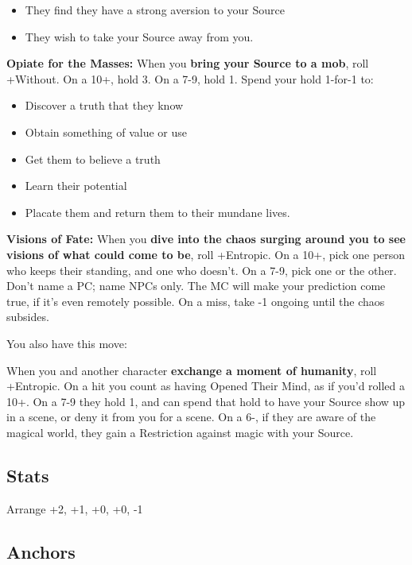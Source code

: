 \documentclass[
  oneside,
  statementpaper,
  9pt]{memoir}
\begin{document}
\begin{itemize}
\tightlist
\item
  They find they have a strong aversion to your Source
\item
  They wish to take your Source away from you.
\end{itemize}

\textbf{Opiate for the Masses:} When you \textbf{bring your Source to a
mob}, roll +Without. On a 10+, hold 3. On a 7-9, hold 1. Spend your hold
1-for-1 to:

\begin{itemize}
\tightlist
\item
  Discover a truth that they know
\item
  Obtain something of value or use
\item
  Get them to believe a truth
\item
  Learn their potential
\item
  Placate them and return them to their mundane lives.
\end{itemize}

\textbf{Visions of Fate:} When you \textbf{dive into the chaos surging
around you to see visions of what could come to be}, roll +Entropic. On
a 10+, pick one person who keeps their standing, and one who doesn't. On
a 7-9, pick one or the other. Don't name a PC; name NPCs only. The MC
will make your prediction come true, if it's even remotely possible. On
a miss, take -1 ongoing until the chaos subsides.

You also have this move:

When you and another character \textbf{exchange a moment of humanity},
roll +Entropic. On a hit you count as having Opened Their Mind, as if
you'd rolled a 10+. On a 7-9 they hold 1, and can spend that hold to
have your Source show up in a scene, or deny it from you for a scene. On
a 6-, if they are aware of the magical world, they gain a Restriction
against magic with your Source.

\hypertarget{stats-3}{%
\subsection{Stats}\label{stats-3}}

Arrange +2, +1, +0, +0, -1

\hypertarget{anchors-2}{%
\subsection{Anchors}\label{anchors-2}}
\end{document}

